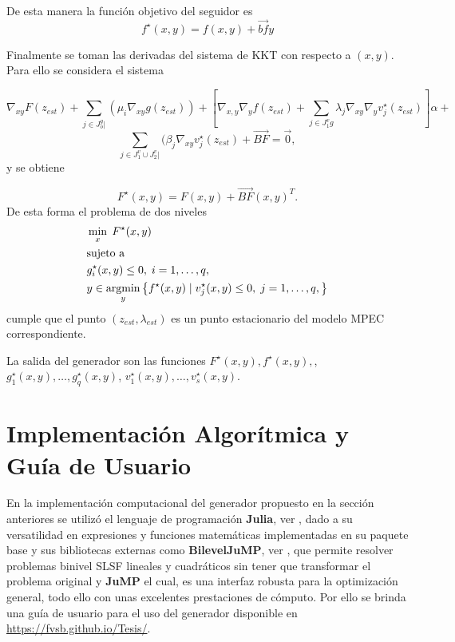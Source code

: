 De esta manera la función objetivo del seguidor es
$$f^{\star}(x,y)=f(x,y)+\vec{bf}y$$


Finalmente se toman  las derivadas del sistema de KKT con respecto a $(x,y)$. Para ello  se considera el sistema
 
    $$
       \nabla_{xy}F(z_{est})+\sum_{j\in J_o^g|}(\mu_i\nabla_{xy}g(z_{est}))+[\nabla_{x,y}\nabla_{y}f(z_{est})+\sum_{j \in J_1^vg}\lambda_j\nabla_{xy}\nabla_{y}v_{j}^{\star}(z_{est})]\alpha+$$ $$\sum_{j \in J_1^v \cup J_2^v|}(\beta_j\nabla_{xy}v_{j}^{\star}(z_{est})+\vec{BF}=\vec{0},
   $$
y se obtiene

$$F^{\star}(x,y)=F(x,y)+\vec{BF}(x,y)^T.$$
De esta forma el problema de dos niveles 
\begin{equation}
\begin{aligned}
& \min_{x} \; F^{\star}(x, y) \\
& \text{sujeto a } \\
& g_i^{\star}(x, y)\leq 0,\;i=1,\ldots,q, \\
& y \in \operatorname*{argmin}_{y} \left\{ f^{\star}(x, y) \mid v_j^{\star}(x, y)\leq 0,\;j=1,\ldots,q ,\right\}
\end{aligned}
\end{equation}
cumple que el punto $(z_{est},\lambda_{est})$ es un punto estacionario del modelo MPEC correspondiente.

La salida del generador son las funciones $F^{\star}(x,y), f^{\star}(x,y),$, $g_1^{\star}(x,y),\ldots,g_q^{\star}(x,y)$, $v_1^{\star}(x,y),\ldots,v_s^{\star}(x,y)$.

\section{Implementación Algorítmica y Guía de Usuario}
En la implementación computacional del generador propuesto en la sección anteriores
se utilizó el lenguaje de programación \textbf{Julia}, ver \cite{Juliadocs}, dado a su versatilidad
en expresiones y funciones matemáticas implementadas en su paquete base y sus bibliotecas externas como 
\textbf{BilevelJuMP}, ver \cite{BilevelJump}, que permite resolver problemas binivel SLSF lineales y cuadráticos
sin tener que transformar el problema original y \textbf{JuMP} \cite{JuMPPaper} el cual, es una interfaz robusta para la optimización general,
todo ello con unas excelentes prestaciones de cómputo. Por ello se brinda una guía de usuario para el uso del generador disponible en 
\href{https://fvsb.github.io/Tesis/}{https://fvsb.github.io/Tesis/}.  


